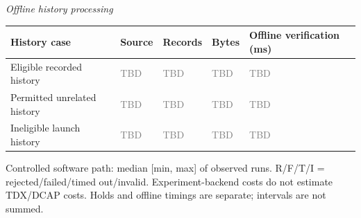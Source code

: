 \begin{table}[t]
\begin{tabularx}{\linewidth}{@{}Y Y Y@{}}
\bottomrule
\end{tabularx}
\par\medskip\textit{Offline history processing}\par\smallskip
\begin{tabularx}{\linewidth}{@{}Y Y Y Y Y@{}}
\toprule
\textbf{History case} & \textbf{Source} & \textbf{Records} & \textbf{Bytes} & \textbf{Offline verification (ms)} \\
\midrule
Eligible recorded history & \textcolor{gray}{TBD} & \textcolor{gray}{TBD} & \textcolor{gray}{TBD} & \textcolor{gray}{TBD} \\
Permitted unrelated history & \textcolor{gray}{TBD} & \textcolor{gray}{TBD} & \textcolor{gray}{TBD} & \textcolor{gray}{TBD} \\
Ineligible launch history & \textcolor{gray}{TBD} & \textcolor{gray}{TBD} & \textcolor{gray}{TBD} & \textcolor{gray}{TBD} \\
\bottomrule
\end{tabularx}
\par\smallskip\footnotesize Controlled software path: median [min, max] of observed runs. R/F/T/I = rejected/failed/timed out/invalid. Experiment-backend costs do not estimate TDX/DCAP costs. Holds and offline timings are separate; intervals are not summed.
\end{table}